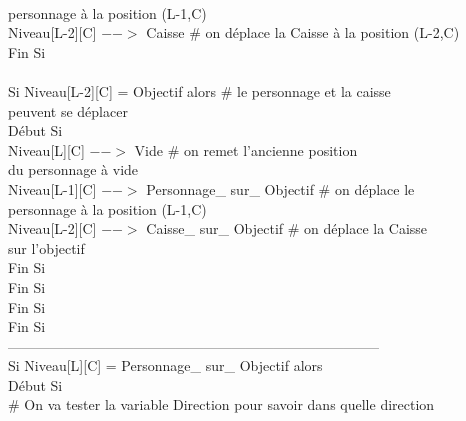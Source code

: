 \documentclass{article}
\begin{document}
\begin{tabbing}
\\ \hspace{5cm} personnage à la position (L-1,C)
\\	\hspace{5cm}			Niveau[L-2][C] $-->$ Caisse			\# on déplace la Caisse à la position (L-2,C)
\\	\hspace{4cm}		Fin Si
\\
\\	\hspace{4cm}		Si Niveau[L-2][C] = Objectif alors         		\# le personnage et la caisse 
\\ \hspace{4cm} peuvent se déplacer
\\	\hspace{4cm}		Début Si
\\	\hspace{5cm}			Niveau[L][C] $-->$ Vide				\# on remet l'ancienne position
\\ \hspace{5cm} du personnage à vide
\\	\hspace{5cm}			Niveau[L-1][C] $-->$ Personnage\_ sur\_ Objectif	\# on déplace le
\\ \hspace{5cm} personnage à la position (L-1,C)
\\	\hspace{5cm}			Niveau[L-2][C] $-->$ Caisse\_ sur\_ Objectif		\# on déplace la Caisse
\\ \hspace{5cm} sur l'objectif
\\	\hspace{4cm}		Fin Si
\\	\hspace{3cm}	Fin Si 
\\	\hspace{2cm} Fin Si 
\\	\hspace{1cm} Fin Si
\\            --------------------------------------------------------------------------------
\\ \hspace{1cm} Si Niveau[L][C] = Personnage\_ sur\_ Objectif alors
\\ \hspace{1cm}	Début Si
\\	\hspace{2cm}	\# On va tester la variable Direction pour savoir dans quelle direction

\end{tabbing}
\end{document}
